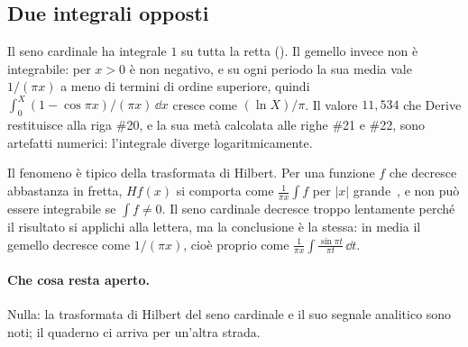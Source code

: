 \subsection{Due integrali opposti}

Il seno cardinale ha integrale $1$ su tutta la retta ().
Il gemello invece non \`e integrabile: per $x>0$ \`e non negativo, e su ogni
periodo la sua media vale $1/(\pi x)$ a meno di termini di ordine superiore,
quindi $\int_0^X(1-\cos\pi x)/(\pi x)\,\dd x$ cresce come $(\ln X)/\pi$. Il
valore $11{,}534$ che Derive restituisce alla riga \#20, e la sua met\`a
calcolata alle righe \#21 e \#22, sono artefatti numerici: l'integrale
diverge logaritmicamente.

Il fenomeno \`e tipico della trasformata di Hilbert. Per una funzione $f$ che
decresce abbastanza in fretta, $Hf(x)$ si comporta come
$\frac{1}{\pi x}\int f$ per $|x|$ grande~\cite{king2009}, e non pu\`o essere
integrabile se $\int f\neq0$. Il seno cardinale decresce troppo lentamente
perch\'e il risultato si applichi alla lettera, ma la conclusione \`e la
stessa: in media il gemello decresce come $1/(\pi x)$, cio\`e proprio come
$\frac{1}{\pi x}\int\frac{\sin\pi t}{\pi t}\,\dd t$.

\paragraph{Che cosa resta aperto.}
Nulla: la trasformata di Hilbert del seno cardinale e il suo segnale analitico
sono noti; il quaderno ci arriva per un'altra strada.
